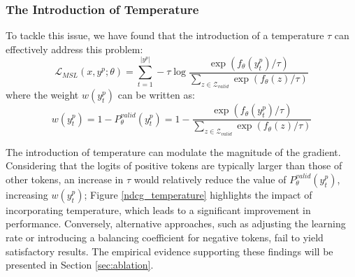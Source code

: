 \documentclass[sigconf,natbib=true]{acmart}
\begin{document}

\subsubsection{The Introduction of Temperature}
To tackle this issue, we have found that the introduction of a temperature $\tau$ can effectively address this problem:
\begin{equation}
    \mathcal{L}_{MSL}(x,y^p;\theta) = \sum_{t=1}^{|y^p|} - \tau \log \frac{\exp(f_\theta(y_t^p) / \tau)}{\sum_{z \in \mathcal{Z}_{valid}} \exp(f_\theta(z) / \tau)}
\end{equation}
where the weight $w(y_t^p)$ can be written as: 
\begin{equation}
w(y_t^p) = 1 - P^{valid}_{\theta}(y_t^p) = 1 - \frac{\exp(f_\theta(y_t^p) / \tau)}{\sum_{z \in \mathcal{Z}_{valid}} \exp{(f_\theta(z) / \tau)}}
\end{equation}

The introduction of temperature can modulate the magnitude of the gradient. Considering that the logits of positive tokens are typically larger than those of other tokens, an increase in $\tau$ would relatively reduce the value of $P^{valid}_{\theta}(y_t^p)$, increasing \(w(y_t^p)\); 
Figure \ref{ndcg_temperature} highlights the impact of incorporating temperature, which leads to a significant improvement in performance. Conversely, alternative approaches, such as adjusting the learning rate or introducing a balancing coefficient for negative tokens, fail to yield satisfactory results. The empirical evidence supporting these findings will be presented in Section \ref{sec:ablation}.
\end{document}
